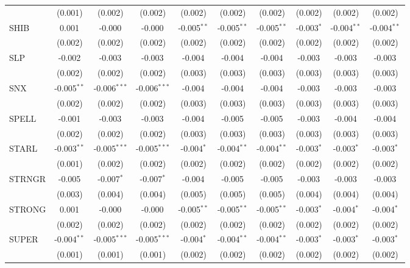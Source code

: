 \begin{table}[!htbp]
\begin{tabular}{@{\extracolsep{5pt}}lccccccccc}
  & (0.001) & (0.002) & (0.002) & (0.002) & (0.002) & (0.002) & (0.002) & (0.002) & (0.002) \\
 SHIB & 0.001$^{}$ & -0.000$^{}$ & -0.000$^{}$ & -0.005$^{**}$ & -0.005$^{**}$ & -0.005$^{**}$ & -0.003$^{*}$ & -0.004$^{**}$ & -0.004$^{**}$ \\
  & (0.002) & (0.002) & (0.002) & (0.002) & (0.002) & (0.002) & (0.002) & (0.002) & (0.002) \\
 SLP & -0.002$^{}$ & -0.003$^{}$ & -0.003$^{}$ & -0.004$^{}$ & -0.004$^{}$ & -0.004$^{}$ & -0.003$^{}$ & -0.003$^{}$ & -0.003$^{}$ \\
  & (0.002) & (0.002) & (0.002) & (0.003) & (0.003) & (0.003) & (0.003) & (0.003) & (0.003) \\
 SNX & -0.005$^{**}$ & -0.006$^{***}$ & -0.006$^{***}$ & -0.004$^{}$ & -0.004$^{}$ & -0.004$^{}$ & -0.003$^{}$ & -0.003$^{}$ & -0.003$^{}$ \\
  & (0.002) & (0.002) & (0.002) & (0.003) & (0.003) & (0.003) & (0.003) & (0.003) & (0.003) \\
 SPELL & -0.001$^{}$ & -0.003$^{}$ & -0.003$^{}$ & -0.004$^{}$ & -0.005$^{}$ & -0.005$^{}$ & -0.003$^{}$ & -0.004$^{}$ & -0.004$^{}$ \\
  & (0.002) & (0.002) & (0.002) & (0.003) & (0.003) & (0.003) & (0.003) & (0.003) & (0.003) \\
 STARL & -0.003$^{**}$ & -0.005$^{***}$ & -0.005$^{***}$ & -0.004$^{*}$ & -0.004$^{**}$ & -0.004$^{**}$ & -0.003$^{*}$ & -0.003$^{*}$ & -0.003$^{*}$ \\
  & (0.001) & (0.002) & (0.002) & (0.002) & (0.002) & (0.002) & (0.002) & (0.002) & (0.002) \\
 STRNGR & -0.005$^{}$ & -0.007$^{*}$ & -0.007$^{*}$ & -0.004$^{}$ & -0.005$^{}$ & -0.005$^{}$ & -0.003$^{}$ & -0.003$^{}$ & -0.003$^{}$ \\
  & (0.003) & (0.004) & (0.004) & (0.005) & (0.005) & (0.005) & (0.004) & (0.004) & (0.004) \\
 STRONG & 0.001$^{}$ & -0.000$^{}$ & -0.000$^{}$ & -0.005$^{**}$ & -0.005$^{**}$ & -0.005$^{**}$ & -0.003$^{*}$ & -0.004$^{*}$ & -0.004$^{*}$ \\
  & (0.002) & (0.002) & (0.002) & (0.002) & (0.002) & (0.002) & (0.002) & (0.002) & (0.002) \\
 SUPER & -0.004$^{**}$ & -0.005$^{***}$ & -0.005$^{***}$ & -0.004$^{*}$ & -0.004$^{**}$ & -0.004$^{**}$ & -0.003$^{*}$ & -0.003$^{*}$ & -0.003$^{*}$ \\
  & (0.001) & (0.001) & (0.001) & (0.002) & (0.002) & (0.002) & (0.002) & (0.002) & (0.002) \\

\end{tabular}
\end{table}
